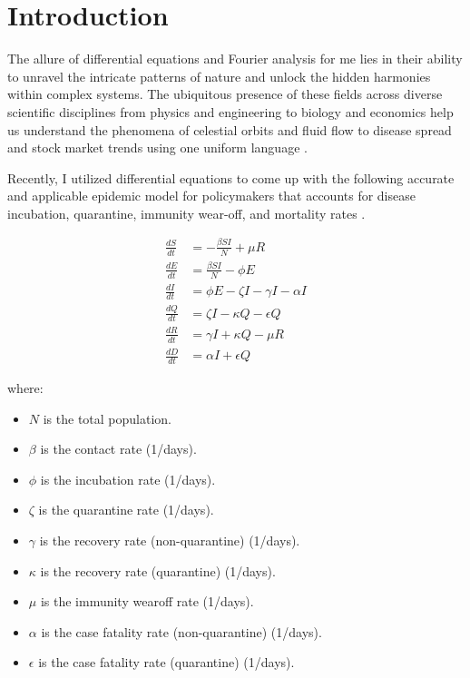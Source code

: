 \section{Introduction}
\label{section:introduction} 
The allure of differential equations and Fourier analysis for me lies in their ability to unravel the intricate patterns of nature and unlock the hidden harmonies within complex systems. 
The ubiquitous presence of these fields across diverse scientific disciplines from physics and engineering to biology and economics help us understand the phenomena of celestial orbits and fluid flow to disease spread and stock market trends using one uniform language \citep{brunton2022data}. 

Recently, I utilized differential equations to come up with the following accurate and applicable epidemic model for policymakers that accounts for disease incubation, quarantine, immunity wear-off, and mortality rates \citep{smith2004sir}.

\begin{align*}        
    \frac{dS}{dt} &= -\frac{\beta S I}{N} + \mu R \\
    \frac{dE}{dt} &= \frac{\beta S I}{N} - \phi E \\
    \frac{dI}{dt} &= \phi E - \zeta I - \gamma I - \alpha I \\
    \frac{dQ}{dt} &= \zeta I - \kappa Q - \epsilon Q \\
    \frac{dR}{dt} &= \gamma I + \kappa Q - \mu R \\
    \frac{dD}{dt} &= \alpha I + \epsilon Q
\end{align*}

\noindent
where:
\begin{itemize}
    \item $N$ is the total population.
    \item $\beta$ is the contact rate (1/days).
    \item $\phi$ is the incubation rate (1/days).
    \item $\zeta$ is the quarantine rate (1/days).
    \item $\gamma$ is the recovery rate (non-quarantine) (1/days).
    \item $\kappa$ is the recovery rate (quarantine) (1/days).
    \item $\mu$ is the immunity wearoff rate (1/days).
    \item $\alpha$ is the case fatality rate (non-quarantine) (1/days).
    \item $\epsilon$ is the case fatality rate (quarantine) (1/days).
\end{itemize}

